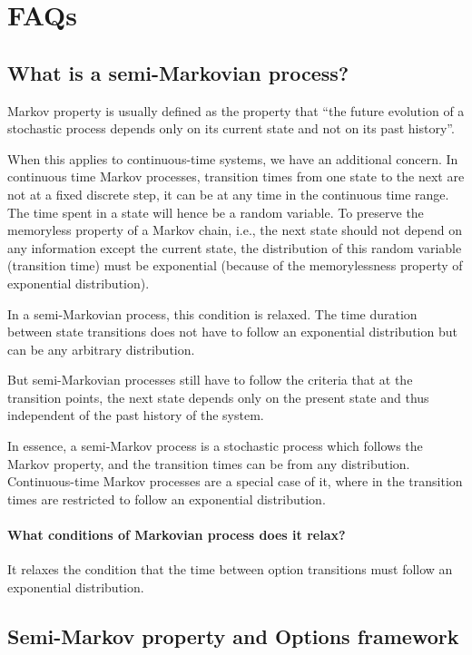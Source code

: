 \section{FAQs}

\subsection{What is a semi-Markovian process?}

Markov property is usually defined as the property that ``the future evolution of a stochastic process depends only on its current state and not on its past history''.

When this applies to continuous-time systems, we have an additional concern.
In continuous time Markov processes, transition times from one state to the next are not at a fixed discrete step, it can be at any time in the continuous time range.
The time spent in a state will hence be a random variable.
To preserve the memoryless property of a Markov chain, i.e., the next state should not depend on any information except the current state, the distribution of this random variable (transition time) must be exponential (because of the memorylessness property of exponential distribution).

In a semi-Markovian process, this condition is relaxed.
The time duration between state transitions does not have to follow an exponential distribution but can be any arbitrary distribution.

But semi-Markovian processes still have to follow the criteria that at the transition points, the next state depends only on the present state and thus independent of the past history of the system.

In essence, a semi-Markov process is a stochastic process which follows the Markov property, and the transition times can be from any distribution.
Continuous-time Markov processes are a special case of it, where in the transition times are restricted to follow an exponential distribution.

\paragraph{What conditions of Markovian process does it relax?}

It relaxes the condition that the time between option transitions must follow an exponential distribution.


\subsection{Semi-Markov property and Options framework}

